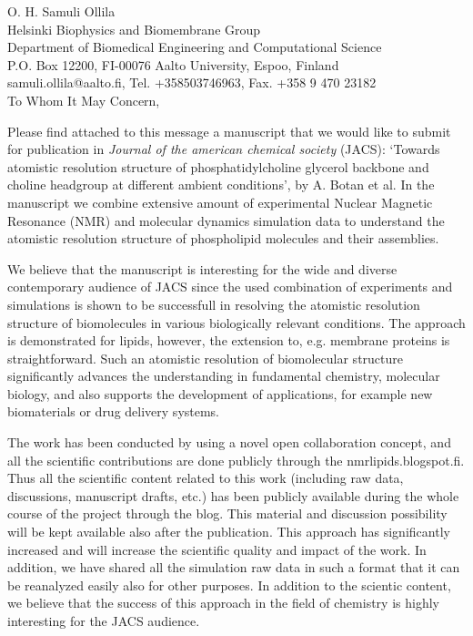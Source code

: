 \documentclass[12pt]{letter}
\begin{document}
\reversemarginpar
\pagestyle{empty}
\noindent O. H. Samuli Ollila \\
\noindent Helsinki Biophysics and Biomembrane Group\\
\noindent Department of Biomedical Engineering and Computational Science\\
\noindent P.O. Box 12200, FI-00076 Aalto University, Espoo, Finland\\
\noindent samuli.ollila@aalto.fi, Tel. +358503746963, Fax. +358 9 470 23182 \\


%
%

To Whom It May Concern,

Please find attached to this message a manuscript that we would like to submit for publication 
in \textit{Journal of the american chemical society} (JACS): 
`Towards atomistic resolution structure of phosphatidylcholine glycerol backbone and choline headgroup at different ambient conditions', 
by A. Botan et al. In the manuscript we combine extensive amount of experimental Nuclear Magnetic Resonance (NMR)
and molecular dynamics simulation data to understand the atomistic resolution structure of phospholipid molecules and their assemblies.

We believe that the manuscript is interesting for the wide and diverse contemporary audience of
JACS since the used combination of experiments and simulations is shown to be successfull in
resolving the atomistic resolution structure of biomolecules in various biologically relevant conditions.
The approach is demonstrated for lipids, however, the extension to, e.g. membrane proteins is straightforward. 
Such an atomistic resolution of  biomolecular structure
significantly advances the understanding in fundamental chemistry, molecular biology, and also supports the development of applications, 
for example new biomaterials or drug delivery systems.

The work has been conducted by using a novel open collaboration concept, and all the scientific contributions
are done publicly through the nmrlipids.blogspot.fi. Thus all the scientific content related to this work
(including raw data, discussions, manuscript drafts, etc.)
has been publicly available during the whole course of the project through the blog. This material and discussion possibility
will be kept available also after the publication. This approach has significantly increased and will increase the scientific
quality and impact of the work. In addition, we have shared all the simulation raw data in such a format
that it can be reanalyzed easily also for other purposes. In addition to the scientic content,
we believe that the success of this approach in the field of chemistry is highly interesting 
for the JACS audience.
\end{document}
